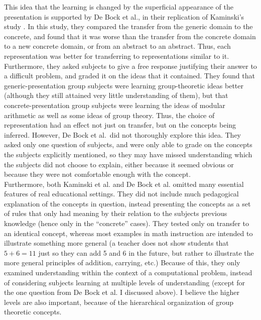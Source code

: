 \documentclass[11pt]{article}
\begin{document}
This idea that the learning is changed by the superficial appearance of the presentation is supported by De Bock et al., in their replication of Kaminski's study \cite{DeBock2011}. In this study, they compared the transfer from the generic domain to the concrete, and found that it was worse than the transfer from the concrete domain to a new concrete domain, or from an abstract to an abstract. Thus, each representation was better for transferring to representations similar to it. Furthermore, they asked subjects to give a free response justifying their answer to a difficult problem, and graded it on the ideas that it contained. They found that generic-presentation group subjects were learning group-theoretic ideas better (although they still attained very little understanding of them), but that concrete-presentation group subjects were learning the ideas of modular arithmetic as well as some ideas of group theory. Thus, the choice of representation had an effect not just on transfer, but on the concepts being inferred. However, De Bock et al.\ did not thoroughly explore this idea. They asked only one question of subjects, and were only able to grade on the concepts the subjects explicitly mentioned, so they may have missed understanding which the subjects did not choose to explain, either because it seemed obvious or because they were not comfortable enough with the concept.\\[11pt]
Furthermore, both Kaminski et al. and De Bock et al. omitted many essential features of real educational settings. They did not include much pedagogical explanation of the concepts in question, instead presenting the concepts as a set of rules that only had meaning by their relation to the subjects previous knowledge (hence only in the ``concrete'' cases). They tested only on transfer to an identical concept, whereas most examples in math instruction are intended to illustrate something more general (a teacher does not show students that $5+6 = 11$ just so they can add 5 and 6 in the future, but rather to illustrate the more general principles of addition, carrying, etc.) Because of this, they only examined understanding within the context of a computational problem, instead of considering subjects learning at multiple levels of understanding (except for the one question from De Bock et al. I discussed above). I believe the higher levels are also important, because of the hierarchical organization of group theoretic concepts. 
\end{document}
